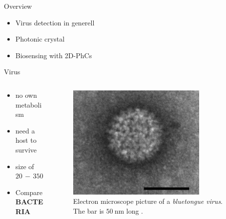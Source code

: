 


\frame{\maketitle}


\begin{frame}{Overview}
\begin{itemize}
  \setlength\itemsep{1.2em}
  \item{Virus detection in generell}
  \item{Photonic crystal}
  \item{Biosensing with 2D-PhCs}
\end{itemize}

\end{frame}

\begin{frame}{Virus}
  \begin{columns}

  \begin{column}{0.49\textwidth}
    \begin{itemize}
      \setlength\itemsep{1.2em}
      \item{no own metabolism}
      \item{need a host to survive} %
      \item{size of $\num{20}\,-\, \num{350}\,\si{\nano\meter}$}
      \item{Compare \textbf{BACTERIA}}
    \end{itemize}
  \end{column}

  \begin{column}{0.49\textwidth}
    \begin{figure}
      \centering
      \includegraphics[width=0.8\textwidth]{./bilder/virus.png}
      \caption{Electron microscope picture of a \emph{bluetongue virus}. The bar is $\SI{50}{\nano\meter}$ long \cite{virus}.}
      \label{fig: 2d_photonic_crystal}
    \end{figure}
  \end{column}

  \end{columns}
\end{frame}

